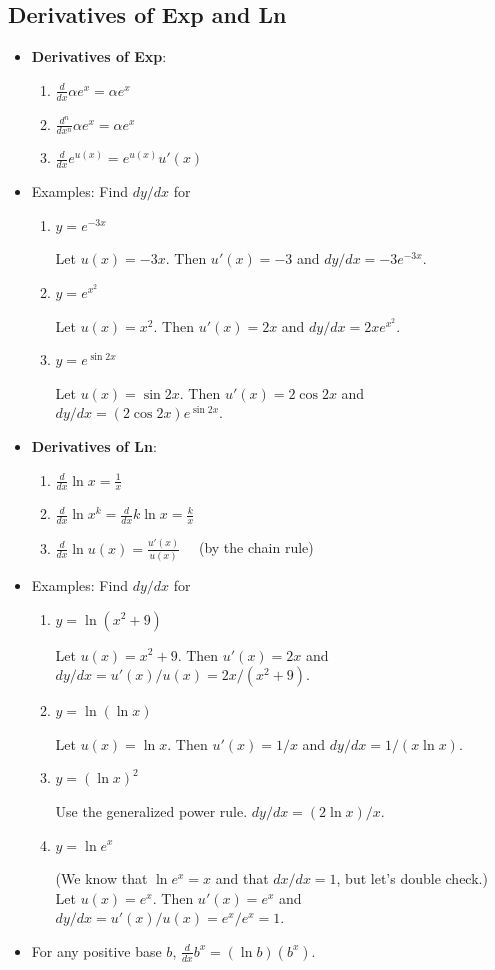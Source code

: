 \documentclass[20pt]{extarticle}
\newcommand{\bi}{\begin{itemize}}
\newcommand{\ei}{\end{itemize}}
\newcommand{\be}{\begin{enumerate}}
\newcommand{\ee}{\end{enumerate}}
\newcommand{\pbof}{\parbox[t]{1.5in}}
\newcommand{\pbff}{\parbox[t]{4in}}
\begin{document}
\subsection{Derivatives of Exp and Ln}
\bi
\item {\bf Derivatives of Exp}:
  \be
  \item $\frac{d}{dx}\alpha e^x = \alpha e^x$
  \item $\frac{d^n}{dx^n} \alpha e^x = \alpha e^x$
  \item $\frac{d}{dx}e^{u(x)}= e^{u(x)} u'(x)$
  \ee

\item Examples:  Find $dy/dx$ for
  \be
  \item \pbof{$y=e^{-3x}$}\pbff{Let $u(x)=-3x$.  Then $u'(x)=-3$
and $dy/dx=-3e^{-3x}$.}
  \item \pbof{$y=e^{x^2}$}\pbff{Let $u(x)=x^2$.  Then $u'(x)=2x$
and $dy/dx=2xe^{x^2}$.}
  \item \pbof{$y=e^{\sin 2x}$}\pbff{Let $u(x)=\sin 2x$.  Then
$u'(x)=2\cos 2x$ and $dy/dx=(2\cos 2x) e^{\sin 2x}$.}
  \ee

\item {\bf Derivatives of Ln}:
  \be
  \item $\frac{d}{dx} \ln x = \frac{1}{x}$
  \item $\frac{d}{dx} \ln x^k = \frac{d}{dx} k \ln x = \frac{k}{x}$
  \item $\frac{d}{dx} \ln u(x) = \frac{u'(x)}{u(x)}\quad$  (by the chain rule)
  \ee

\item Examples:  Find $dy/dx$ for
  \be
  \item \pbof{$y=\ln(x^2+9)$}\pbff{Let $u(x)=x^2+9$.  Then
$u'(x)=2x$ and $dy/dx=u'(x)/u(x)=2x/(x^2+9)$.}
  \item \pbof{$y=\ln(\ln x)$}\pbff{Let $u(x)=\ln x$.  Then
$u'(x)=1/x$ and $dy/dx=1/(x\ln x)$.}
  \item \pbof{$y=(\ln x)^2$}\pbff{Use the generalized power rule.
 $dy/dx=(2\ln x)/x$.}
  \item \pbof{$y=\ln e^x$}\pbff{(We know that $\ln e^x=x$ and
that $dx/dx=1$, but let's double check.)  Let $u(x)=e^x$.  Then
$u'(x)=e^x$ and $dy/dx=u'(x)/u(x)=e^x/e^x=1$.}
  \ee

\item For any positive base $b$, $\frac{d}{dx} b^x = (\ln
b)\left(b^x\right)$.

\ei
\end{document}
